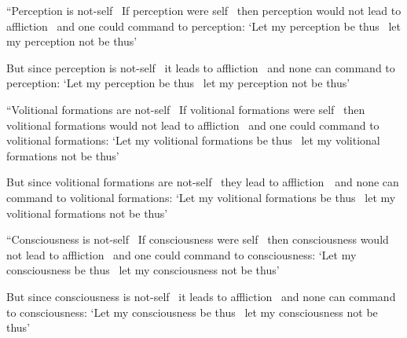 \begin{english-only-hang}
  ``Perception is not-self \breathmark\ If perception were self \breathmark\ then perception would not lead to affliction \breathmark\ and one could command to perception: `Let my perception be thus \breathmark\ let my perception not be thus'
\end{english-only-hang}
\begin{english-only-hangtogether}
  But since perception is not-self \breathmark\ it leads to affliction \breathmark\ and none can command to perception: `Let my perception be thus \breathmark\ let my perception not be thus'
\end{english-only-hangtogether}

\begin{english-only-hang}
  ``Volitional formations are not-self \breathmark\ If volitional formations were self \breathmark\ then volitional formations would not lead to affliction \breathmark\ and one could command to volitional formations: `Let my volitional formations be thus \breathmark\ let my volitional formations not be thus'
\end{english-only-hang}
\begin{english-only-hangtogether}
  But since volitional formations are not-self \breathmark\ they lead to \mbox{affliction}~\breathmark\ and none can command to volitional formations: `Let my volitional formations be thus \breathmark\ let my volitional formations not be thus'
\end{english-only-hangtogether}

\begin{english-only-hang}
  ``Consciousness is not-self \breathmark\ If consciousness were self \breathmark\ then consciousness would not lead to affliction \breathmark\ and one could command to consciousness: `Let my consciousness be thus \breathmark\ let my consciousness not be thus'
\end{english-only-hang}
\begin{english-only-hangtogether}
  But since consciousness is not-self \breathmark\ it leads to affliction \breathmark\ and none can command to consciousness: `Let my consciousness be thus \breathmark\ let my consciousness not be thus'
\end{english-only-hangtogether}

